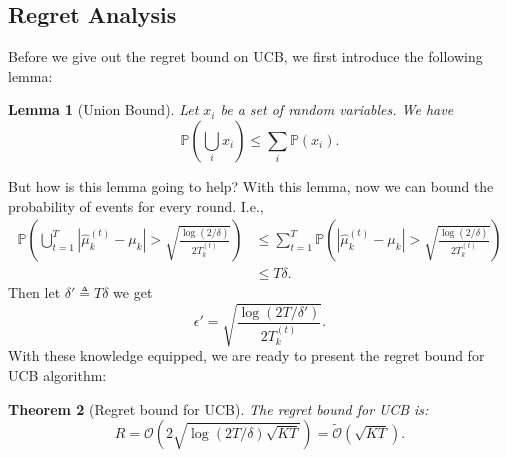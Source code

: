 \documentclass[11pt]{article}
\newtheorem{theorem}{Theorem}
\newtheorem{lemma}[theorem]{Lemma}
\begin{document}
\subsection{Regret Analysis}
Before we give out the regret bound on UCB, we first introduce the following lemma:
\begin{lemma}[Union Bound]
Let $x_i$ be a set of random variables. We have
\[\mathbb{P}\left(\bigcup_i x_i\right) \leq \sum_i \mathbb{P}(x_i).\]
\end{lemma}
But how is this lemma going to help? With this lemma, now we can bound the probability of events for every round. I.e., 
\begin{align*}
    \mathbb{P}\left( \bigcup_{t=1}^{T} |\widehat{\mu}_k^{(t)} - \mu_k| > \sqrt{\frac{\log(2/\delta)}{2T^{(t)}_k}} \right) &\leq \sum_{t=1}^T \mathbb{P}\left(  |\widehat{\mu}_k^{(t)} - \mu_k| > \sqrt{\frac{\log(2/\delta)}{2T^{(t)}_k}} \right)\\
    &\leq T\delta.
\end{align*}
Then let $\delta' \triangleq T\delta$ we get 
\begin{equation}
    \epsilon' = \sqrt{\frac{\log(2T/\delta')}{2T^{(t)}_k}}.
\label{union_heoff}
\end{equation}
With these knowledge equipped, we are ready to present the regret bound for UCB algorithm:
\begin{theorem}[Regret bound for UCB]
The regret bound for UCB is:
\[R = \mathcal{O}\left( 2\sqrt{\log(2T/\delta)\sqrt{KT}} \right) = \widetilde{\mathcal{O}}(\sqrt{KT}).\]
\end{theorem}
\end{document}

